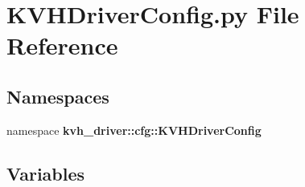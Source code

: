 \section{\-K\-V\-H\-Driver\-Config.\-py \-File \-Reference}
\label{KVHDriverConfig_8py}
\subsection*{\-Namespaces}
\begin{DoxyCompactItemize}
\item 
namespace {\bf kvh\-\_\-driver\-::cfg\-::\-K\-V\-H\-Driver\-Config}
\end{DoxyCompactItemize}
\subsection*{\-Variables}
